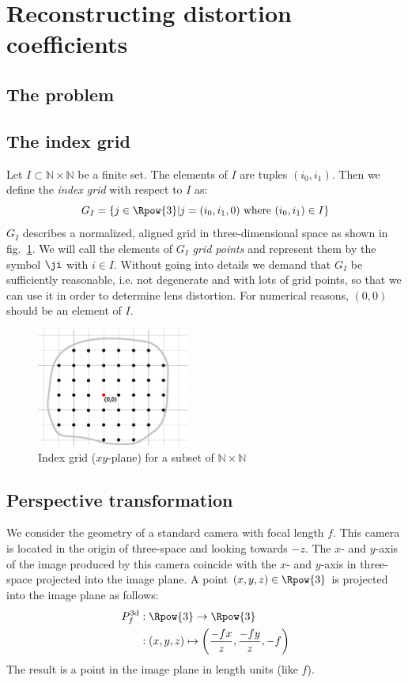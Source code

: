 \section{Reconstructing distortion coefficients}
\subsection{The problem}
\subsection{The index grid}
Let $I \subset \mathbb{N}\times\mathbb{N}$ be a finite set. The elements of $I$ are tuples $(i_0,i_1)$.
Then we define the {\em index grid} with respect to $I$ as:
\begin{equation}
G_I = \left\{j \in \Rpow{3} | j = (i_0,i_1,0) \mathrm{\ where\ } (i_0,i_1) \in I\right\}
\end{equation}
$G_I$ describes a normalized, aligned grid in three-dimensional space as shown in fig.~\ref{fig:IndexGrid}.
We will call the elements of $G_I$ {\em grid points} and represent them by the symbol $\ji$ with $i\in I$.
Without going into details we demand that $G_I$ be sufficiently reasonable, i.e. not degenerate
and with lots of grid points, so that we can use it in order to determine lens distortion.
For numerical reasons, $(0,0)$ should be an element of $I$.
\begin{figure}[h]
\label{fig:IndexGrid}
\centering
\includegraphics[width=5cm]{index_grid.eps}
\caption{Index grid ($xy$-plane) for a subset of $\mathbb{N}\times\mathbb{N}$}
\end{figure}
\subsection{Perspective transformation}
We consider the geometry of a standard camera with focal length $f$. This camera is located
in the origin of three-space and looking towards $-z$. The $x$- and $y$-axis of the image produced by this camera
coincide with the $x$- and $y$-axis in three-space projected into the image plane.
A point $(x,y,z)\in\Rpow{3}$ is projected into the image plane as follows:
\begin{align}
\label{PerspectiveProjection}
P_f^\mathrm{3d} &: \Rpow{3} \rightarrow \Rpow{3} \nonumber\\
    &:  \left(x,y,z\right) \mapsto \left(\frac {-fx}{z},\frac {-fy}{z},-f\right)
\end{align}
The result is a point in the image plane in length units (like $f$).





